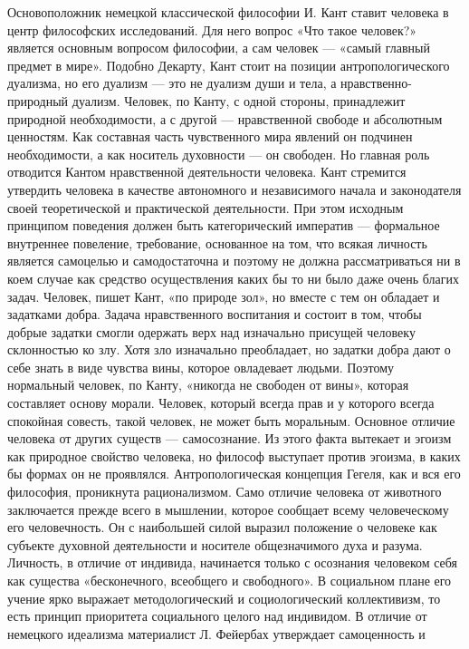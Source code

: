 \documentclass[12pt]{article}
\begin{document}
Основоположник  немецкой  классической  философии  И.  Кант  ставит  человека  в  центр  философских
исследований. Для него вопрос «Что такое человек?» является основным вопросом философии, а сам человек
— «самый главный предмет в мире». Подобно Декарту, Кант стоит на позиции антропологического дуализма,
но его дуализм — это не дуализм души и тела, а нравственно-природный дуализм. Человек, по Канту, с одной
стороны,  принадлежит  природной  необходимости,  а  с  другой  —  нравственной  свободе  и  абсолютным
ценностям.  Как  составная  часть  чувственного  мира  явлений  он  подчинен  необходимости,  а  как  носитель
духовности — он свободен. Но главная роль отводится Кантом нравственной деятельности человека.
Кант  стремится  утвердить  человека  в  качестве  автономного  и  независимого  начала  и  законодателя  своей
теоретической  и  практической  деятельности.  При  этом  исходным  принципом  поведения  должен  быть
категорический императив — формальное внутреннее повеление, требование, основанное на том, что всякая
личность является самоцелью и самодостаточна и поэтому не должна рассматриваться ни в коем случае как
средство осуществления каких бы то ни было даже очень благих задач.
Человек, пишет Кант, «по природе зол», но вместе с тем он обладает и задатками добра. Задача нравственного
воспитания и состоит в том, чтобы добрые задатки смогли одержать верх над изначально присущей человеку
склонностью ко злу. Хотя зло изначально преобладает, но задатки добра дают о себе знать в виде чувства вины,
которое овладевает людьми. Поэтому нормальный человек, по Канту, «никогда не свободен от вины», которая
составляет основу морали. Человек, который всегда прав и у которого всегда спокойная совесть, такой человек,
не может быть моральным. Основное отличие человека от других существ — самосознание. Из этого факта
вытекает и эгоизм как природное свойство человека, но философ выступает против эгоизма, в каких бы формах
он не проявлялся.
Антропологическая концепция Гегеля, как и вся его философия, проникнута рационализмом. Само отличие
человека от животного заключается прежде всего в мышлении, которое сообщает всему человеческому его
человечность. Он с наибольшей силой выразил положение о человеке как субъекте духовной деятельности и
носителе общезначимого духа и разума. Личность, в отличие от индивида, начинается только с осознания
человеком себя как существа «бесконечного, всеобщего и свободного». В социальном плане его учение ярко
выражает методологический и социологический коллективизм, то есть принцип приоритета социального целого
над  индивидом.  В  отличие  от  немецкого  идеализма  материалист  Л.  Фейербах  утверждает  самоценность  и
\end{document}
